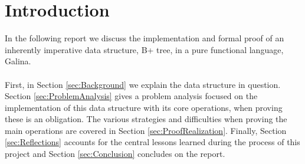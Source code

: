 \section{Introduction}
\label{sec:Introduction}
In the following report we discuss the implementation and formal proof of an inherently imperative data structure, B+ tree, in a pure functional language, Galina. 
\paragraph{}
First, in Section \ref{sec:Background} we explain the data structure in question. Section \ref{sec:ProblemAnalysis} gives a problem analysis focused on the implementation of this data structure with its core operations, when proving these is an obligation. The various strategies and difficulties when proving the main operations are covered in Section \ref{sec:ProofRealization}. Finally, Section \ref{sec:Reflections} accounts for the central lessons learned during the process of this project and Section \ref{sec:Conclusion} concludes on the report.